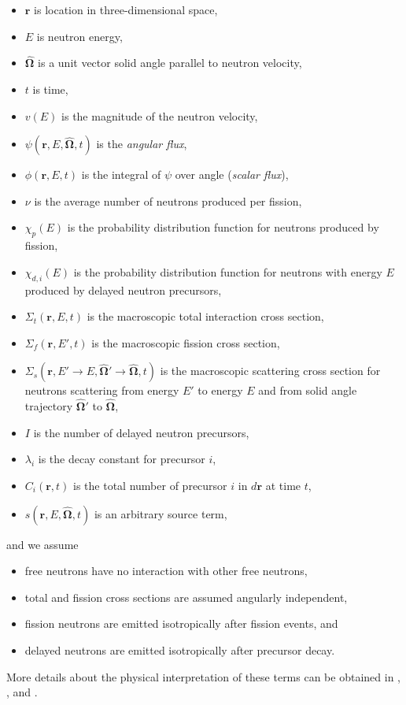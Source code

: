 \begin{itemize}
  \item $\mathbf{r}$ is location in three-dimensional space,
  \item $E$ is neutron energy,
  \item $\mathbf{\hat\Omega}$ is a unit vector solid angle parallel to neutron velocity,
  \item $t$ is time,
  \item $v(E)$ is the magnitude of the neutron velocity,
  \item $\psi(\mathbf{r},E,\mathbf{\hat\Omega},t)$ is the \emph{angular flux},
  \item $\phi(\mathbf{r},E,t)$ is the integral of $\psi$ over angle (\emph{scalar flux}),
  \item $\nu$ is the average number of neutrons produced per fission,
  \item $\chi_p(E)$ is the probability distribution function for neutrons produced by fission,
  \item $\chi_{d,i}(E)$ is the probability distribution function for neutrons with energy $E$ produced by
    delayed neutron precursors,
  \item $\Sigma_t(\mathbf{r},E,t)$ is the macroscopic total interaction cross section,
  \item $\Sigma_f(\mathbf{r},E',t)$ is the macroscopic fission cross section,
  \item $\Sigma_s(\mathbf{r},E'\to E,\mathbf{\hat\Omega'\to\hat\Omega},t)$ is the macroscopic scattering cross
    section for neutrons scattering from energy $E'$ to energy $E$ and from solid angle trajectory
    $\mathbf{\hat\Omega'}$ to $\mathbf{\hat\Omega}$,
  \item $I$ is the number of delayed neutron precursors,
  \item $\lambda_i$ is the decay constant for precursor $i$,
  \item $C_i(\mathbf{r},t)$ is the total number of precursor $i$ in $d\mathbf{r}$ at time $t$,
  \item $s(\mathbf{r},E,\mathbf{\hat\Omega},t)$ is an arbitrary source term,
\end{itemize}
and we assume
\begin{itemize}
  \item free neutrons have no interaction with other free neutrons,
  \item total and fission cross sections are assumed angularly independent,
  \item fission neutrons are emitted isotropically after fission events, and
  \item delayed neutrons are emitted isotropically after precursor decay.
\end{itemize}
More details about the physical interpretation of these terms can be obtained in \cite{duderstadt},
\cite{lewis}, and \cite{lewistrans}.

